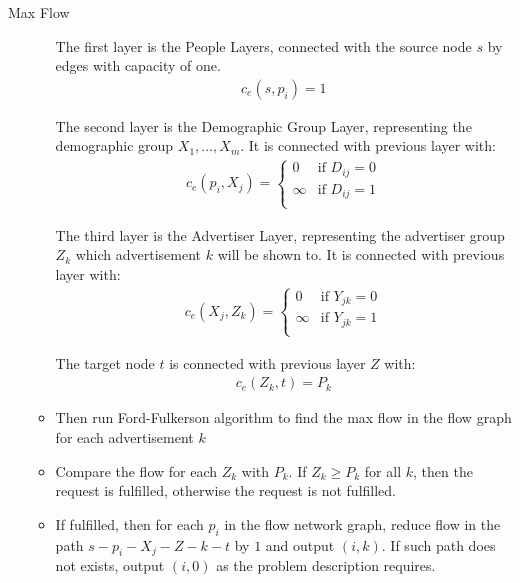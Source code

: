\documentclass{article}
\numberwithin{table}{section}
\numberwithin{figure}{section}
\begin{document}
\begin{section}{Max Flow}
\begin{enumerate}[(a)]
\begin{tcolorbox}[breakable]
\begin{itemize}
            The first layer is the People Layers, connected with the source node $s$ by edges with capacity of one. 
            \begin{align*}
                c_e(s, p_{i}) = 1
            \end{align*}

            The second layer is the Demographic Group Layer, representing the demographic group $X_1, \dots, X_m$. It is connected with previous layer with:
            \begin{align*}
                c_e(p_{i}, X_j) = \begin{cases}
                    0 & \text{if $D_{ij} = 0$} \\
                    \infty & \text{if $D_{ij} = 1$} \\
                \end{cases}
            \end{align*}

            The third layer is the Advertiser Layer, representing the advertiser group $Z_k$ which advertisement $k$ will be shown to. It is connected with previous layer with:
            \begin{align*}
                c_e(X_j, Z_k) = \begin{cases}
                    0 & \text{if $Y_{jk} = 0$} \\
                    \infty & \text{if $Y_{jk} = 1$} \\
                \end{cases}
            \end{align*}

            The target node $t$ is connected with previous layer $Z$ with:
            \begin{align*}
                c_e(Z_k, t) = P_k
            \end{align*}

            \item Then run Ford-Fulkerson algorithm to find the max flow in the flow graph for each advertisement $k$
            
            \item Compare the flow for each $Z_k$ with $P_k$. If $Z_k \geq P_k$ for all $k$, then the request is fulfilled, otherwise the request is not fulfilled.  
            
            \item If fulfilled, then for each $p_i$ in the flow network graph, reduce flow in the path $s-p_i-X_j-Z-k-t$ by $1$ and output $(i, k)$. If such path does not exists, output $(i, 0)$ as the problem description requires. 
        \end{itemize}
    \end{tcolorbox}
    

\end{enumerate}
\end{section}
\end{document}
